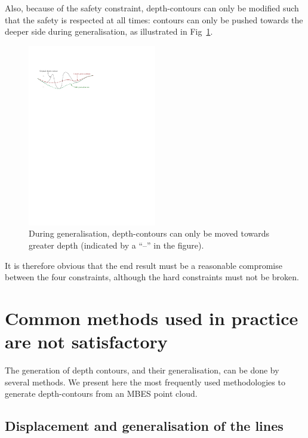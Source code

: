 Also, because of the safety constraint, depth-contours can only be modified such that the safety is respected at all times: contours can only be pushed towards the deeper side during generalisation, as illustrated in Fig~\ref{fig:genvalidornot}. 
\begin{figure}
  \centering
  \includegraphics[width=0.5\textwidth]{figs/genvalidornot}
  \caption{During generalisation, depth-contours can only be moved towards greater depth (indicated by a ``--'' in the figure).}
\label{fig:genvalidornot}
\end{figure}
It is therefore obvious that the end result must be a reasonable compromise between the four constraints, although the hard constraints must not be broken.


\section{Common methods used in practice are not satisfactory}

The generation of depth contours, and their generalisation, can be done by several methods.
We present here the most frequently used methodologies to generate depth-contours from an MBES point cloud.


\subsection{Displacement and generalisation of the lines}


